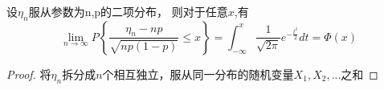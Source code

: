 \begin{theorem}
设$\eta_{n}$服从参数为n,p的二项分布， 则对于任意$x$,有
\begin{equation}
\lim _{n \rightarrow \infty} P\left\{\frac{\eta_{n}-n p}{\sqrt{n p(1-p)}} \leq x\right\}=\int_{-\infty}^{x} \frac{1}{\sqrt{2 \pi}} e^{-\frac{t^{2}}{2}} d t=\Phi(x)
\end{equation}
\end{theorem}

\begin{proof}
    将$\eta_{n}$拆分成$n$个相互独立，服从同一分布的随机变量$X_1,X_2,...$之和
\end{proof}



